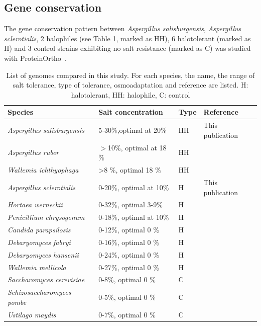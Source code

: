 \documentclass[jof,article,submit,moreauthors,pdftex,10pt,a4paper]{Definitions/mdpi}
\newcommand{\horWer}{\textit{Hortaea werneckii}}
\newcommand{\aspRub}{\textit{Aspergillus ruber}}
\newcommand{\penChr}{\textit{Penicillium chrysogenum}}
\newcommand{\debFab}{\textit{Debaryomyces fabryi}}
\newcommand{\debHan}{\textit{Debaryomyces hansenii}}
\newcommand{\walIch}{\textit{Wallemia ichthyophaga}}
\newcommand{\walMel}{\textit{Wallemia mellicola}}
\newcommand{\canPar}{\textit{Candida parapsilosis}}
\newcommand{\sacCer}{\textit{Saccharomyces cerevisiae}}
\newcommand{\schPom}{\textit{Schizosaccharomyces pombe}}
\newcommand{\phiSp}{\textit{Aspergillus salisburgensis}}
\newcommand{\phiScl}{\textit{Aspergillus sclerotialis}}
\newcommand{\ustMay}{\textit{Ustilago maydis}}
\begin{document}
\subsection{Gene conservation}
The gene conservation pattern between \phiSp{}, \phiScl{}, 2 halophiles (see Table 1, marked as HH), 6 halotolerant (marked as H) and 3 control strains  exhibiting no salt resistance (marked as C) was studied with ProteinOrtho~\cite{Lechner2011}. 

\begin{table}[htbp]
  \begin{center}
    \small
    \begin{tabular}{|l|l|l|l|}
      \hline
      Species   & Salt concentration & Type & Reference\\
      \hline
      {\phiSp}  & 5-30$\%$,optimal at 20$\%$ & HH &
      This publication \\
      {\aspRub} & $>$10$\%$,  optimal at 18$\%$& HH &\cite{Kis-Papo2014-dn}\\
      {\walIch} & >8 $\%$, optimal 18 $\%$ & HH &\cite{Zajc2013}\\
      \hline
      {\phiScl} & 0-20$\%$, optimal at 10$\%$ & H & This publication \\
      {\horWer} & 0-32$\%$, optimal 3-9$\%$ & H & \cite{Plemenitas2014}\\
      {\penChr} & 0-18$\%$, optimal at 10$\%$ & H &\cite{Attaby2001} \\
      {\canPar} & 0-12$\%$, optimal 0 $\%$ & H & \cite{Krauke2010-ed}\\
      {\debFab} & 0-16$\%$, optimal 0 $\%$ & H & \cite{Michan2013}\\
      {\debHan} & 0-24$\%$, optimal 0 $\%$ & H & \cite{Michan2013}\\
      {\walMel} & 0-27$\%$, optimal 0 $\%$ & H & \cite{Kuncic2010} \\
      \hline
      {\sacCer} & 0-8$\%$, optimal 0 $\%$ & C & \cite{Lages1999}\\
      {\schPom} & 0-5$\%$, optimal 0 $\%$ & C & \cite{Lages1999}\\
      {\ustMay} & 0-7$\%$, optimal 0 $\%$ & C & \cite{Salmeron2011,Klement2012} \\
      \hline
    \end{tabular}
    \caption{\label{tab:species} List of genomes compared in this
      study. For each species, the name, the range of salt tolerance, type of
      tolerance, osmoadaptation and reference are listed. H: halotolerant, HH: halophile, C: control}
  \end{center}
\end{table}
\end{document}

